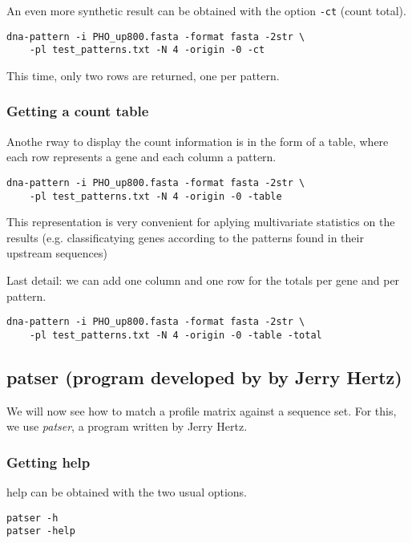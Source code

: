 An even more synthetic result can be obtained with the option
\texttt{-ct} (count total).

\begin{verbatim}
dna-pattern -i PHO_up800.fasta -format fasta -2str \
    -pl test_patterns.txt -N 4 -origin -0 -ct
\end{verbatim}

This time, only two rows are returned, one per pattern. 

\subsubsection{Getting a count table}

Anothe rway to display the count information is in the form of a
table, where each row represents a gene and each column a pattern.

\begin{verbatim}
dna-pattern -i PHO_up800.fasta -format fasta -2str \
    -pl test_patterns.txt -N 4 -origin -0 -table
\end{verbatim}

This representation is very convenient for aplying multivariate
statistics on the results (e.g. classificatying genes according to the
patterns found in their upstream sequences)

Last detail: we can add one column and one row for the totals per
gene and per pattern.

\begin{verbatim}
dna-pattern -i PHO_up800.fasta -format fasta -2str \
    -pl test_patterns.txt -N 4 -origin -0 -table -total
\end{verbatim}




\subsection{patser (program developed by by Jerry Hertz)}

We will now see how to match a profile matrix against a sequence
set. For this, we use \textit{patser}, a program written by Jerry
Hertz. 

\subsubsection{Getting help}

help can be obtained with the two usual options.

\begin{verbatim}
patser -h
patser -help
\end{verbatim}

